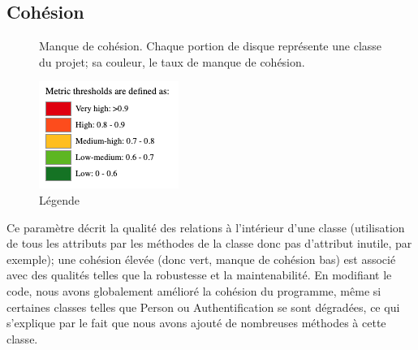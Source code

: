 \newpage
\subsection{Cohésion}
    \begin{figure}[h!]
        \centering
        \qquad
        \caption{Manque de cohésion. Chaque portion de disque représente une classe du projet; sa couleur, le taux de manque de cohésion.}
    \end{figure}
    \begin{figure}[h!]
        \centering
        \includegraphics{Figures/Legend.png}
        \caption{Légende}
    \end{figure}
Ce paramètre décrit la qualité des relations à l'intérieur d'une classe (utilisation de tous les attributs par les méthodes de la classe donc pas d'attribut inutile, par exemple); une cohésion élevée (donc vert, manque de cohésion bas) est associé avec des qualités telles que la robustesse et la maintenabilité. En modifiant le code, nous avons globalement amélioré la cohésion du programme, même si certaines classes telles que Person ou Authentification se sont dégradées, ce qui s'explique par le fait que nous avons ajouté de nombreuses méthodes à cette classe.  

